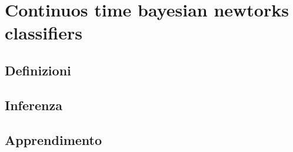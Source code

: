 
\chapter{Continuos time bayesian newtorks classifiers}
\label{cap:ctbnc}

\lipsum[1]

\section{Definizioni}
\lipsum[2]

\section{Inferenza}
\lipsum[3]

\section{Apprendimento}
\lipsum[4-5]
